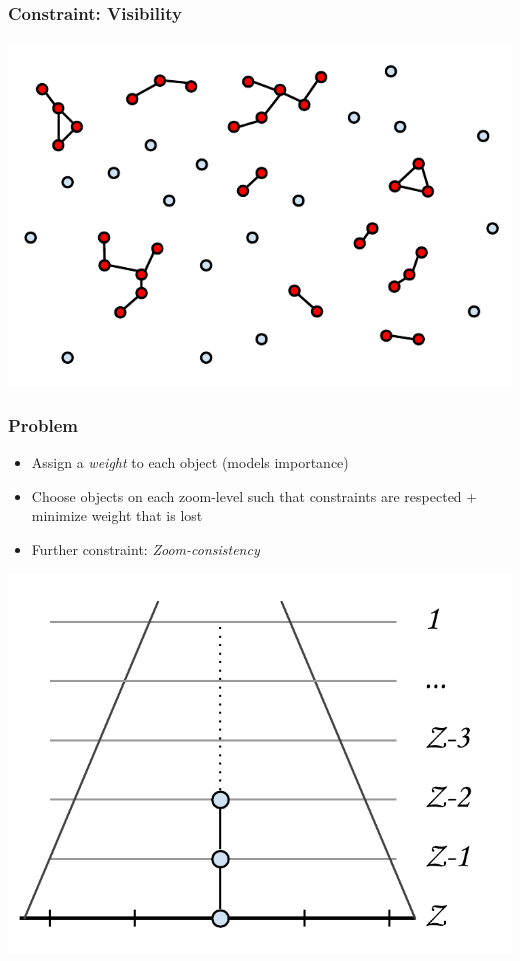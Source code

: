 \documentclass{beamer}
\begin{document}
\frame
{
  \frametitle{Constraint: Visibility}
  \begin{center}
  	\includegraphics[scale=0.8]{figs/cvl-proximity.pdf}
  \end{center}
 
}

\frame
{
  \frametitle{Problem}
  \begin{itemize}
  \item Assign a \emph{weight} to each object (models importance)
  \item Choose objects on each zoom-level such that constraints are respected + minimize weight that is lost
  \item Further constraint: \emph{Zoom-consistency}
  \end{itemize}
  \begin{center}
  	\includegraphics[scale=0.5]{figs/cvl-problem.pdf}
  \end{center}
 
}
\end{document}

